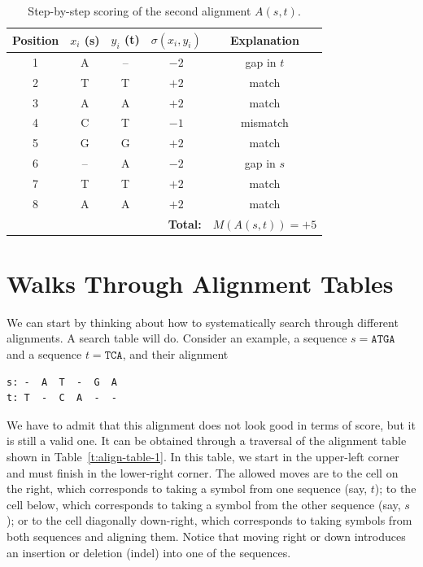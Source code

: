 \begin{table}[h!]
\centering
\caption{Step-by-step scoring of the second alignment $A(s,t)$.}
\label{t:step_by_step_scoring}
\begin{tabular}{ccccc}
\hline
\textbf{Position} & \textbf{$x_i$ (s)} & \textbf{$y_i$ (t)} & \textbf{$\sigma(x_i, y_i)$} & \textbf{Explanation} \\
\hline
1 & A & -- & $-2$ & gap in $t$ \\
2 & T & T  & $+2$ & match \\
3 & A & A  & $+2$ & match \\
4 & C & T  & $-1$ & mismatch \\
5 & G & G  & $+2$ & match \\
6 & -- & A & $-2$ & gap in $s$ \\
7 & T & T  & $+2$ & match \\
8 & A & A  & $+2$ & match \\
\hline
\multicolumn{4}{r}{\textbf{Total:}} & $\displaystyle M(A(s,t)) = +5$ \\
\hline
\end{tabular}
\end{table}

\section{Walks Through Alignment Tables}

We can start by thinking about how to systematically search through different alignments. A search table will do. Consider an example, a sequence $s=\texttt{ATGA}$ and a sequence $t=\texttt{TCA}$, and their alignment 

\begin{verbatim}
s: -  A  T  -  G  A
t: T  -  C  A  -  -
\end{verbatim}

We have to admit that this alignment does not look good in terms of score, but it is still a valid one. It can be obtained through a traversal of the alignment table shown in Table~\ref{t:align-table-1}. In this table, we start in the upper-left corner and must finish in the lower-right corner. The allowed moves are to the cell on the right, which corresponds to taking a symbol from one sequence (say, $t$); to the cell below, which corresponds to taking a symbol from the other sequence (say, $s$); or to the cell diagonally down-right, which corresponds to taking symbols from both sequences and aligning them. Notice that moving right or down introduces an insertion or deletion (indel) into one of the sequences.

